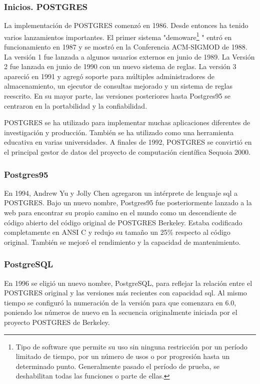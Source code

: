 \subsubsection{Inicios. POSTGRES}
\label{sec:postgres}

La implementación de POSTGRES comenzó en 1986. Desde entonces ha tenido varios lanzamientos importantes. El primer sistema "demoware\footnote{Tipo de software que permite su uso sin ninguna restricción por un período limitado de tiempo, por un número de usos o por progresión hasta un determinado punto. Generalmente pasado el período de prueba, se deshabilitan todas las funciones o parte de ellas.} " entró en funcionamiento en 1987 y se mostró en la Conferencia ACM-SIGMOD de 1988. La versión 1 fue lanzada a algunos usuarios externos en junio de 1989. La Versión 2 fue lanzada en junio de 1990 con un nuevo sistema de reglas. La versión 3 apareció en 1991 y agregó soporte para múltiples administradores de almacenamiento, un ejecutor de consultas mejorado y un sistema de reglas reescrito. En su mayor parte, las versiones posteriores hasta Postgres95 se centraron en la portabilidad y la confiabilidad.

POSTGRES se ha utilizado para implementar muchas aplicaciones diferentes de investigación y producción. También se ha utilizado como una herramienta educativa en varias universidades. A finales de 1992, POSTGRES se convirtió en el principal gestor de datos del proyecto de computación científica Sequoia 2000.

\subsubsection{Postgres95}
\label{sec:postgres95}

En 1994, Andrew Yu y Jolly Chen agregaron un intérprete de lenguaje \acrshort{sql} a POSTGRES. Bajo un nuevo nombre, Postgres95 fue posteriormente lanzado a la web para encontrar su propio camino en el mundo como un descendiente de código abierto del código original de POSTGRES Berkeley. Estaba codificado completamente en ANSI C y redujo su tamaño un 25\% respecto al código original. También se mejoró el rendimiento y la capacidad de mantenimiento.

\subsubsection{PostgreSQL}
\label{sec:postgresql}

En 1996 se eligió un nuevo nombre, PostgreSQL, para reflejar la relación entre el POSTGRES original y las versiones más recientes con capacidad \acrshort{sql}. Al mismo tiempo se configuró la numeración de la versión para que comenzara en 6.0, poniendo los números de nuevo en la secuencia originalmente iniciada por el proyecto POSTGRES de Berkeley.

